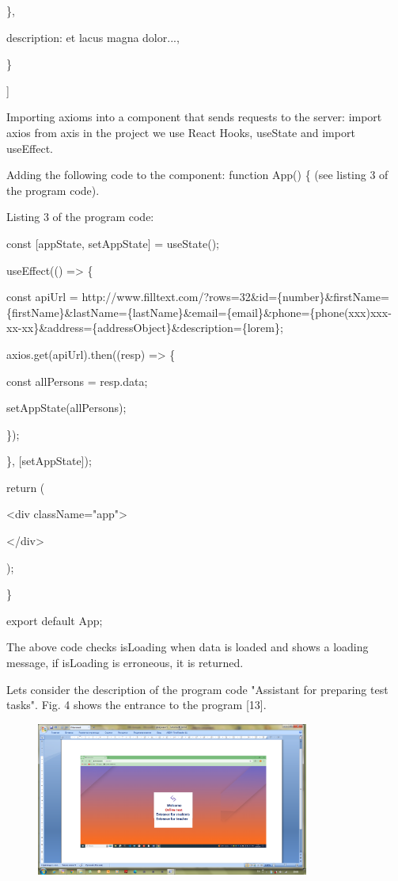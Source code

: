 \},

description: \textquotesingle et lacus magna dolor...\textquotesingle,

\}

{]}

Importing axioms into a component that sends requests to the server:
import axios from \textquotesingle axis\textquotesingle{} in the project
we use React Hooks, useState and import useEffect.

Adding the following code to the component: function App() \{ (see
listing 3 of the program code).

Listing 3 of the program code:

const {[}appState, setAppState{]} = useState();

useEffect(() =\textgreater{} \{

const apiUrl =
\textquotesingle http://www.filltext.com/?rows=32\&id=\{number\}\&firstName=\{firstName\}\&lastName=\{lastName\}\&email=\{email\}\&phone=\{phone\textbar(xxx)xxx-xx-xx\}\&address=\{addressObject\}\&description=\{lorem\}\textquotesingle;

axios.get(apiUrl).then((resp) =\textgreater{} \{

const allPersons = resp.data;

setAppState(allPersons);

\});

\}, {[}setAppState{]});

return (

\textless div className="app"\textgreater{}

\textless/div\textgreater{}

);

\}

export default App;

The above code checks isLoading when data is loaded and shows a loading
message, if isLoading is erroneous, it is returned.

Let\textquotesingle s consider the description of the program code
"Assistant for preparing test tasks". Fig. 4 shows the entrance to the
program {[}13{]}.

\begin{figure}[H]
	\centering
	\includegraphics[width=0.8\textwidth]{assets/48}
	\caption*{}
\end{figure}

